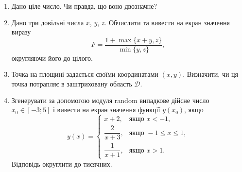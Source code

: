 \cleardoublepage


\begin{enumerate}
\item Дано ціле число. Чи правда, що воно двозначне?

\item Дано три довільні числа $x$, $y$, $z$. Обчислити та вивести на екран значення виразу
$$
F=\frac{1+\max\{x+y, z\}}{\min\{y, z\}},
$$
округляючи його до цілого.

\item Точка на площині задається своїми координатами $(x, y)$. Визначити, чи ця точка потрапляє в заштриховану область $\mathcal{D}$.
\begin{center}
\end{center}

\item Згенерувати за допомогою модуля {\ttfamily random} випадкове дійсне число $x_0\in [-3; 5]$ і вивести на екран значення функції $y(x_0)$, якщо
$$
y(x)=\begin{cases}x+2, & \mbox{якщо } x<-1, \\
\dfrac{2}{x+3}, & \mbox{якщо } -1\leqslant x\leqslant 1, \\
\dfrac{1}{x+1}, & \mbox{якщо } x>1.
\end{cases}
$$
Відповідь округлити до тисячних.
\end{enumerate}

\cleardoublepage

